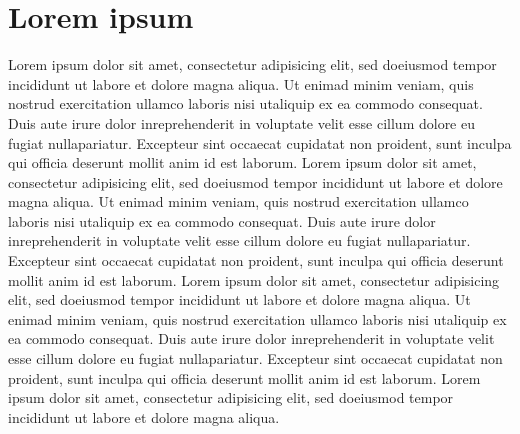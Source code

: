 \section{Lorem ipsum}
\label{p3}

Lorem ipsum dolor sit amet, consectetur adipisicing elit, sed doeiusmod tempor incididunt ut labore et dolore magna aliqua.
Ut enimad minim veniam, quis nostrud exercitation ullamco laboris nisi utaliquip ex ea commodo consequat.
Duis aute irure dolor inreprehenderit in voluptate velit esse cillum dolore eu fugiat nullapariatur.
Excepteur sint occaecat cupidatat non proident, sunt inculpa qui officia deserunt mollit anim id est laborum.
Lorem ipsum dolor sit amet, consectetur adipisicing elit, sed doeiusmod tempor incididunt ut labore et dolore magna aliqua.
Ut enimad minim veniam, quis nostrud exercitation ullamco laboris nisi utaliquip ex ea commodo consequat.
Duis aute irure dolor inreprehenderit in voluptate velit esse cillum dolore eu fugiat nullapariatur.
Excepteur sint occaecat cupidatat non proident, sunt inculpa qui officia deserunt mollit anim id est laborum.
Lorem ipsum dolor sit amet, consectetur adipisicing elit, sed doeiusmod tempor incididunt ut labore et dolore magna aliqua.
Ut enimad minim veniam, quis nostrud exercitation ullamco laboris nisi utaliquip ex ea commodo consequat.
Duis aute irure dolor inreprehenderit in voluptate velit esse cillum dolore eu fugiat nullapariatur.
Excepteur sint occaecat cupidatat non proident, sunt inculpa qui officia deserunt mollit anim id est laborum.
Lorem ipsum dolor sit amet, consectetur adipisicing elit, sed doeiusmod tempor incididunt ut labore et dolore magna aliqua.
